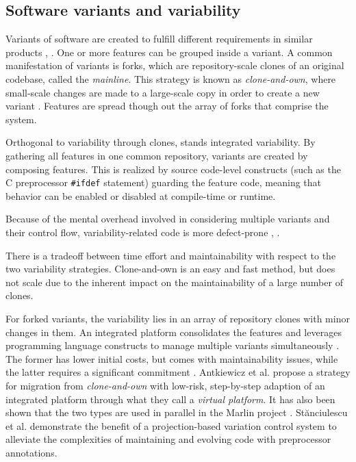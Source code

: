 \subsection{Software variants and variability}
Variants of software are created to fulfill different requirements in similar products \cite{antkiewicz2014flexible}, \cite{stanciulescu2015}. One or more features can be grouped inside a variant. A common manifestation of variants is forks, which are repository-scale clones of an original codebase, called the \textit{mainline}. This strategy is known as \textit{clone-and-own}, where small-scale changes are made to a large-scale copy in order to create a new variant \cite{stanciulescu2015}. Features are spread though out the array of forks that comprise the system.

Orthogonal to variability through clones, stands integrated variability. By gathering all features in one common repository, variants are created by composing features. This is realized by source code-level constructs (such as the C preprocessor \texttt{\#ifdef} statement) guarding the feature code, meaning that behavior can be enabled or disabled at compile-time or runtime.

Because of the mental overhead involved in considering multiple variants and their control flow, variability-related code is more defect-prone \cite{medeiros2013syntaxerrors}, \cite{melo2016latin}.

There is a tradeoff between time effort and maintainability with respect to the two variability strategies. Clone-and-own is an easy and fast method, but does not scale due to the inherent impact on the maintainability of a large number of clones.

For forked variants, the variability lies in an array of repository clones with minor changes in them. An integrated platform consolidates the features and leverages programming language constructs to manage multiple variants simultaneously \cite{stanciulescu2015}. The former has lower initial costs, but comes with maintainability issues, while the latter requires a significant commitment \cite{antkiewicz2014flexible}. Antkiewicz et al. \cite{antkiewicz2014flexible} propose a strategy for migration from \textit{clone-and-own} with low-risk, step-by-step adaption of an integrated platform through what they call a \textit{virtual platform}. It has also been shown that the two types are used in parallel in the Marlin project \cite{stanciulescu2015}. St\u{a}nciulescu et al. \cite{stanciulescu2016concepts} demonstrate the benefit of a projection-based variation control system to alleviate the complexities of maintaining and evolving code with preprocessor annotations.

